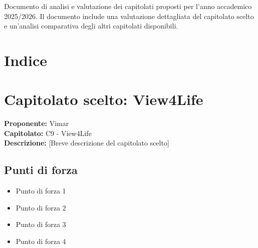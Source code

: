 \documentclass[a4paper,12pt]{article}
\begin{document}
\vspace{0.5cm}

\begin{center}
\begin{tcolorbox}[colback=secondaryblue!10,colframe=secondaryblue,width=0.9\textwidth,arc=3mm,boxrule=0.8pt,title={\bfseries Abstract}]
Documento di analisi e valutazione dei capitolati proposti per l'anno accademico 2025/2026. Il documento include una valutazione dettagliata del capitolato scelto e un'analisi comparativa degli altri capitolati disponibili.
\end{tcolorbox}
\end{center}

\newpage

\section*{Indice}
\renewcommand{\cftsecpagefont}{\normalfont}
\renewcommand{\cftsecleader}{\cftdotfill{\cftsecdotsep}}
\setlength{\cftbeforesecskip}{2pt}
\begin{center}
\begin{tcolorbox}[colback=lightgray,colframe=darkgray,width=0.9\textwidth,arc=2mm,boxrule=0.5pt]
\tableofcontents
\end{tcolorbox}
\end{center}

\newpage

\section{Capitolato scelto: View4Life}

\begin{tcolorbox}[colback=secondaryblue!5,colframe=secondaryblue,arc=2mm,boxrule=0.5pt]
\textbf{Proponente:} Vimar \\
\textbf{Capitolato:} C9 - View4Life \\
\textbf{Descrizione:} [Breve descrizione del capitolato scelto]
\end{tcolorbox}

\subsection{Punti di forza}
\begin{itemize}
\item Punto di forza 1
\item Punto di forza 2
\item Punto di forza 3
\item Punto di forza 4
\end{itemize}
\end{document}
